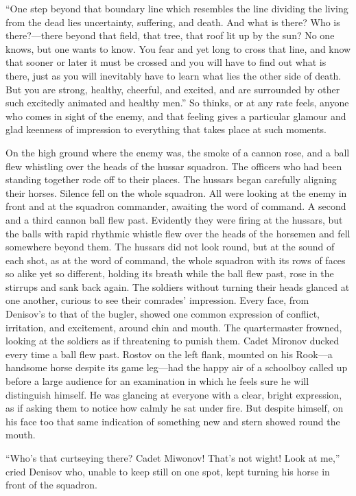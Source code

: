 ``One step beyond that boundary line which resembles the line
dividing the living from the dead lies uncertainty, suffering,
and death. And what is there? Who is there?---there beyond that
field, that tree, that roof lit up by the sun? No one knows, but
one wants to know. You fear and yet long to cross that line, and
know that sooner or later it must be crossed and you will have to
find out what is there, just as you will inevitably have to learn
what lies the other side of death. But you are strong, healthy,
cheerful, and excited, and are surrounded by other such excitedly
animated and healthy men.'' So thinks, or at any rate feels,
anyone who comes in sight of the enemy, and that feeling gives a
particular glamour and glad keenness of impression to everything
that takes place at such moments.

On the high ground where the enemy was, the smoke of a cannon
rose, and a ball flew whistling over the heads of the hussar
squadron. The officers who had been standing together rode off to
their places. The hussars began carefully aligning their
horses. Silence fell on the whole squadron. All were looking at
the enemy in front and at the squadron commander, awaiting the
word of command. A second and a third cannon ball flew
past. Evidently they were firing at the hussars, but the balls
with rapid rhythmic whistle flew over the heads of the horsemen
and fell somewhere beyond them. The hussars did not look round,
but at the sound of each shot, as at the word of command, the
whole squadron with its rows of faces so alike yet so different,
holding its breath while the ball flew past, rose in the stirrups
and sank back again. The soldiers without turning their heads
glanced at one another, curious to see their comrades'
impression. Every face, from Denisov's to that of the bugler,
showed one common expression of conflict, irritation, and
excitement, around chin and mouth. The quartermaster frowned,
looking at the soldiers as if threatening to punish them. Cadet
Mironov ducked every time a ball flew past. Rostov on the left
flank, mounted on his Rook---a handsome horse despite its game
leg---had the happy air of a schoolboy called up before a large
audience for an examination in which he feels sure he will
distinguish himself. He was glancing at everyone with a clear,
bright expression, as if asking them to notice how calmly he sat
under fire. But despite himself, on his face too that same
indication of something new and stern showed round the mouth.

``Who's that curtseying there? Cadet Miwonov! That's not wight!
Look at me,'' cried Denisov who, unable to keep still on one
spot, kept turning his horse in front of the squadron.


